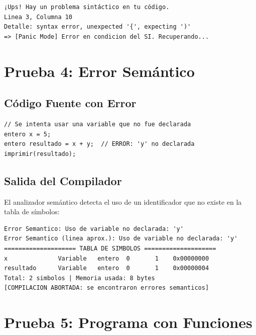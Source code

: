 \begin{verbatim}
¡Ups! Hay un problema sintáctico en tu código.
Linea 3, Columna 10
Detalle: syntax error, unexpected '{', expecting ')'
=> [Panic Mode] Error en condicion del SI. Recuperando...
\end{verbatim}


\section{Prueba 4: Error Semántico}

\subsection{Código Fuente con Error}

\begin{lstlisting}[style=tppstyle, caption={Programa con error semántico: variable no declarada}]
// Se intenta usar una variable que no fue declarada
entero x = 5;
entero resultado = x + y;  // ERROR: 'y' no declarada
imprimir(resultado);
\end{lstlisting}

\subsection{Salida del Compilador}

El analizador semántico detecta el uso de un identificador que no existe en la tabla de símbolos:

\begin{verbatim}
Error Semantico: Uso de variable no declarada: 'y'
Error Semantico (linea aprox.): Uso de variable no declarada: 'y'
==================== TABLA DE SIMBOLOS ====================
x              Variable   entero  0       1    0x00000000
resultado      Variable   entero  0       1    0x00000004
Total: 2 simbolos | Memoria usada: 8 bytes
[COMPILACION ABORTADA: se encontraron errores semanticos]
\end{verbatim}


\section{Prueba 5: Programa con Funciones}

